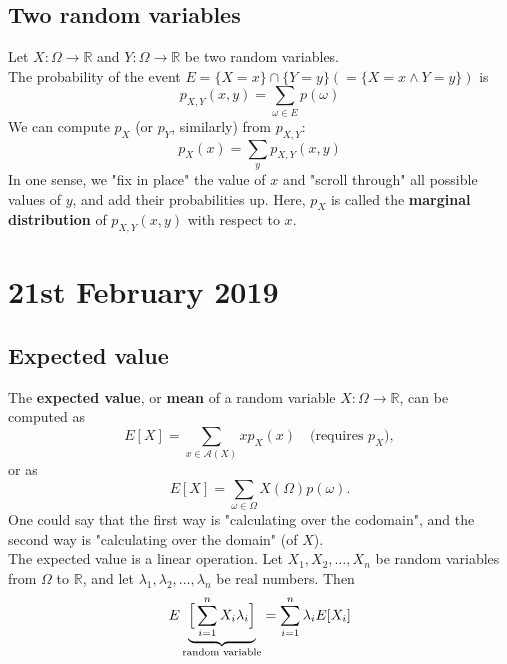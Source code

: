 \documentclass{article}
\begin{document}
\subsection{Two random variables}
Let $X: \Omega \to \mathbb{R}$ and $Y: \Omega \to \mathbb{R}$ be two random variables. \\
The probability of the event $E = \{X = x\} \cap \{Y = y\}(= \{X = x \land Y = y\})$ is
\begin{equation}
	p_{X, Y}(x, y) = \sum_{\omega \in E} p(\omega)
\end{equation}
We can compute $p_X$ (or $p_Y$, similarly) from $p_{X, Y}$:
\begin{equation}
	p_X(x) = \sum_y p_{X, Y}(x, y)
\end{equation}
In one sense, we "fix in place" the value of $x$ and "scroll through" all possible values of $y$, and add their probabilities up. Here, $p_X$ is called the \textbf{marginal distribution} of $p_{X, Y}(x, y)$ with respect to $x$.

\section{21st February 2019}

\subsection{Expected value}
The \textbf{expected value}, or \textbf{mean} of a random variable $X: \Omega \to \mathbb{R}$, can be computed as
\begin{equation}
	E[X] = \sum_{x \in \mathcal A(X)} x p_X(x) \quad \text{(requires $p_X$)},
\end{equation}
or as
\begin{equation}
	E[X] = \sum_{\omega \in \Omega} X(\Omega) p(\omega).
\end{equation}
One could say that the first way is "calculating over the codomain", and the second way is "calculating over the domain" (of $X$). \\

The expected value is a linear operation. Let $X_1, X_2, \dots, X_n$ be random variables from $\Omega$ to $\mathbb{R}$, and let $\lambda_1, \lambda_2, \dots, \lambda_n$ be real numbers. Then
\begin{equation}
	E\underbrace{\Bigr[\sum_{i=1}^n X_i\lambda_i\Bigl]}_{\text{random variable}} = \sum_{i=1}^n \lambda_i E[X_i]
\end{equation}
\end{document}
